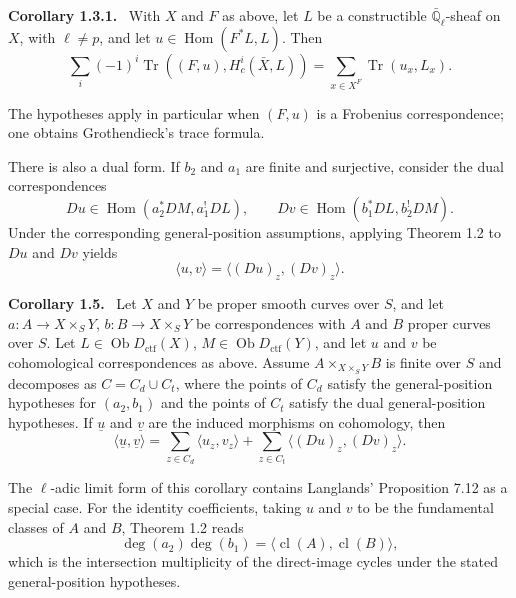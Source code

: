 \documentclass[12pt]{article}
\newcommand{\QQ}{\mathbb Q}
\newcommand{\Hom}{\operatorname{Hom}}
\newcommand{\Tr}{\operatorname{Tr}}
\newcommand{\cl}{\operatorname{cl}}
\newcommand{\ob}{\operatorname{Ob}}
\newenvironment{statement}[1]{\par\medskip\noindent\textbf{#1.}\ }{\par\medskip}
\begin{document}
\begin{statement}{Corollary 1.3.1}
With $X$ and $F$ as above, let $L$ be a constructible $\bar{\QQ}_\ell$-sheaf on $X$, with $\ell\ne p$, and let $u\in\Hom(F^*L,L)$. Then
\[
   \sum_i(-1)^i\Tr((F,u),H^i_c(\bar X,L))
      =\sum_{x\in X^F}\Tr(u_x,L_x).
\]
\end{statement}

The hypotheses apply in particular when $(F,u)$ is a Frobenius correspondence; one obtains Grothendieck's trace formula.

There is also a dual form. If $b_2$ and $a_1$ are finite and surjective, consider the dual correspondences
\[
   Du\in\Hom(a_2^*DM,a_1^!DL),
   \qquad
   Dv\in\Hom(b_1^*DL,b_2^!DM).
\]
Under the corresponding general-position assumptions, applying Theorem 1.2 to $Du$ and $Dv$ yields
\begin{equation}
   \langle u,v\rangle=\langle (Du)_z,(Dv)_z\rangle.
   \tag{1.4.1}
\end{equation}

\begin{statement}{Corollary 1.5}
Let $X$ and $Y$ be proper smooth curves over $S$, and let $a:A\to X\times_SY$, $b:B\to X\times_SY$ be correspondences with $A$ and $B$ proper curves over $S$. Let $L\in\ob D_{\mathrm{ctf}}(X)$, $M\in\ob D_{\mathrm{ctf}}(Y)$, and let $u$ and $v$ be cohomological correspondences as above. Assume $A\times_{X\times_SY}B$ is finite over $S$ and decomposes as $C=C_d\cup C_t$, where the points of $C_d$ satisfy the general-position hypotheses for $(a_2,b_1)$ and the points of $C_t$ satisfy the dual general-position hypotheses. If $\underline u$ and $\underline v$ are the induced morphisms on cohomology, then
\begin{equation}
   \langle \underline u,\underline v\rangle=
   \sum_{z\in C_d}\langle u_z,v_z\rangle+
   \sum_{z\in C_t}\langle (Du)_z,(Dv)_z\rangle.
   \tag{1.5.1}
\end{equation}
\end{statement}

The $\ell$-adic limit form of this corollary contains Langlands' Proposition 7.12 as a special case. For the identity coefficients, taking $u$ and $v$ to be the fundamental classes of $A$ and $B$, Theorem 1.2 reads
\begin{equation}
   \deg(a_2)\deg(b_1)=\langle \cl(A),\cl(B)\rangle,
   \tag{1.7.1}
\end{equation}
which is the intersection multiplicity of the direct-image cycles under the stated general-position hypotheses.
\end{document}
